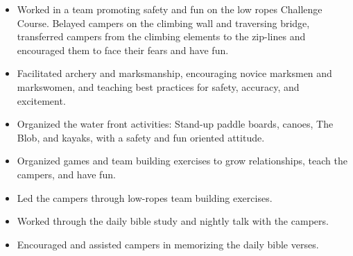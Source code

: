 \documentclass[letterpaper,10pt]{article}
\providecommand{\tightlist}
  {\setlength{\itemsep}{4pt}\setlength{\parskip}{0pt}}
\begin{document}
    \begin{itemize}
        \tightlist{}
        \item
        Worked in a team promoting safety and fun on the low ropes Challenge Course.
        Belayed campers on the climbing wall and traversing bridge, transferred campers from the climbing elements to the zip-lines and encouraged them to face their fears and have fun.
        \item
        Facilitated archery and marksmanship, encouraging novice marksmen and markswomen, and teaching best practices for safety, accuracy, and excitement.
        \item
        Organized the water front activities: Stand-up paddle boards, canoes, The Blob, and kayaks, with a safety and fun oriented attitude.
        \item
        Organized games and team building exercises to grow relationships, teach the campers, and have fun.
        \item
        Led the campers through low-ropes team building exercises.
        \item
        Worked through the daily bible study and nightly talk with the campers.
        \item
        Encouraged and assisted campers in memorizing the daily bible verses.
    \end{itemize}
\end{document}
